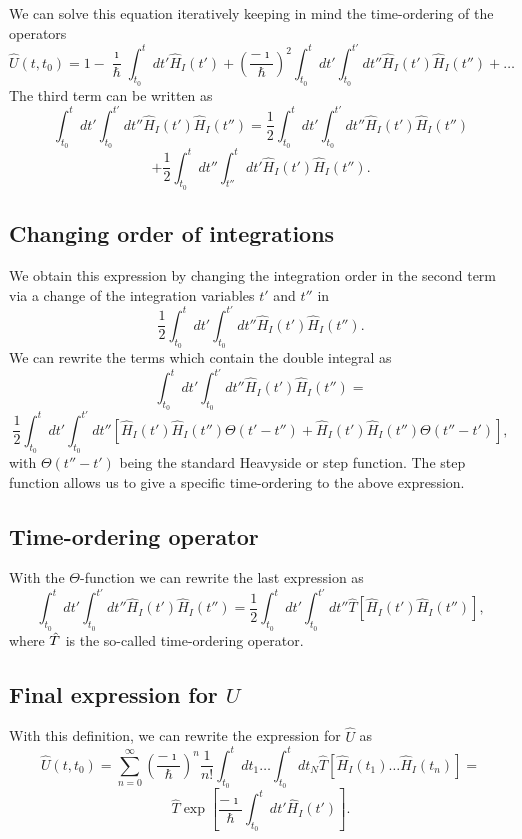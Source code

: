 \documentclass[%
oneside,                 %
final,                   %
10pt]{article}
\begin{document}
We can solve this equation iteratively keeping in mind the time-ordering of the operators
\[
\hat{U}(t,t_0)=1-\frac{\imath}{\hbar}\int_{t_0}^t dt' \hat{H}_I(t')+\left(\frac{-\imath}{\hbar}\right)^2\int_{t_0}^t dt'\int_{t_0}^{t'} dt'' \hat{H}_I(t')\hat{H}_I(t'')+\dots
\]
The third term can be written as 
\[
\int_{t_0}^t dt'\int_{t_0}^{t'} dt'' \hat{H}_I(t')\hat{H}_I(t'')=
\frac{1}{2}\int_{t_0}^t dt'\int_{t_0}^{t'} dt'' \hat{H}_I(t')\hat{H}_I(t'')
\]
\[
+\frac{1}{2}\int_{t_0}^t dt''\int_{t''}^{t} dt' \hat{H}_I(t')\hat{H}_I(t'').
\]

\subsection{Changing order of integrations}

We obtain this expression by changing the integration order in the second term
via a change of the integration variables $t'$ and $t''$  in 
\[
\frac{1}{2}\int_{t_0}^t dt'\int_{t_0}^{t'} dt'' \hat{H}_I(t')\hat{H}_I(t'').
\]
We can rewrite the terms which contain the double integral as
\[
\int_{t_0}^t dt'\int_{t_0}^{t'} dt'' \hat{H}_I(t')\hat{H}_I(t'')=
\]
\[
\frac{1}{2}\int_{t_0}^t dt'\int_{t_0}^{t'} dt''\left[\hat{H}_I(t')\hat{H}_I(t'')\Theta(t'-t'')
+\hat{H}_I(t')\hat{H}_I(t'')\Theta(t''-t')\right],
\]
with $\Theta(t''-t')$ being the standard Heavyside or step function. The step function allows us to give a specific time-ordering to the above expression.

\subsection{Time-ordering operator}

With the $\Theta$-function we can rewrite the last expression as 
\[
\int_{t_0}^t dt'\int_{t_0}^{t'} dt'' \hat{H}_I(t')\hat{H}_I(t'')=
\frac{1}{2}\int_{t_0}^t dt'\int_{t_0}^{t'} dt''\hat{T}\left[\hat{H}_I(t')\hat{H}_I(t'')\right],
\]
where $\Hat{T}$ is the so-called time-ordering operator. 

\subsection{Final expression for $U$}

With this definition, we can rewrite the expression for $\hat{U}$ as 
\[
\hat{U}(t,t_0)=\sum_{n=0}^{\infty}\left(\frac{-\imath}{\hbar}\right)^n\frac{1}{n!}
\int_{t_0}^t dt_1\dots \int_{t_0}^t dt_N \hat{T}\left[\hat{H}_I(t_1)\dots\hat{H}_I(t_n)\right]=
\]
\[
\hat{T}\exp{\left[\frac{-\imath}{\hbar}
\int_{t_0}^t dt' \hat{H}_I(t')\right]}.
\]
\end{document}
